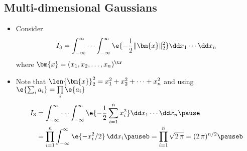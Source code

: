
\begin{slide}
\section[-2]{Multi-dimensional Gaussians}

\begin{PauseHighLight}
  \begin{itemize}
  \item Consider
    \begin{align*}
      I_3 = \int_{-\infty}^\infty \cdots \int_{-\infty}^\infty
      \e{-\frac{1}{2}\|\bm{x}\|_2^2} \dd x_1 \cdots \dd x_n
    \end{align*}
    where $\bm{x} = (x_1, x_2, \ldots, x_n)^\tr$\pause
  \item Note that $\len{\bm{x}}_2^2 = x_1^2+x_2^2+\cdots+x_n^2$ and
    using $\e{\sum_i a_i} = \prod\limits_i \e{a_i}$
  \begin{align*}
    I_3 &= \int_{-\infty}^\infty \cdots \int_{-\infty}^\infty
          \e{-\frac{1}{2}  \sum\limits_{i=1}^n x_i^2} \dd x_1 \cdots \dd
          x_n \pause\\
        &= \prod_{i=1}^n \int_{-\infty}^\infty  \e{-x_i^2/2} \,
          \dd x_i \pauseb =  \prod_{i=1}^n \sqrt{2\,\pi} = (2\,\pi)^{n/2} \pauseb
  \end{align*}
  \end{itemize}
\end{PauseHighLight}

\end{slide}



